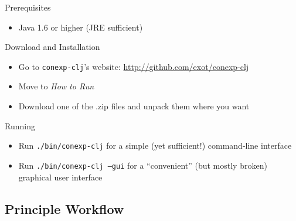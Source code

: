 \documentclass{beamer}
\newcommand{\cclj}{\texttt{conexp-clj}\xspace}
\newenvironment{code}[1]{\begin{block}{Code\ifx#1\empty\else~(#1)\fi}\prompt}{\end{block}}
\newcommand{\prompt}{\texttt{\textcolor{gray}{user=>}}}
\newcommand{\codeinput}[1]{\parbox[t]{0.8\linewidth}{\ifx#1\empty\else\lstinline{#1}\fi}\\}
\newcommand{\codeoutput}[1]{\textit{\texttt{#1}}\\\prompt}
\newcommand{\codeio}[2]{\onslide<+->\codeinput{#1}\onslide<+->\codeoutput{#2}}
\begin{document}
\begin{frame}
  \onslide<+->

  \begin{block}{Prerequisites}
    \begin{itemize}
    \item<+-> Java 1.6 or higher (JRE sufficient)
    \end{itemize}
  \end{block}

  \onslide<+->
  \begin{block}{Download and Installation}
    \begin{itemize}
    \item<+-> Go to \cclj's website: \url{http://github.com/exot/conexp-clj}
    \item<+-> Move to \emph{How to Run}
    \item<+-> Download one of the .zip files and unpack them where you want
    \end{itemize}
  \end{block}

  \onslide<+->
  \begin{block}{Running}
    \begin{itemize}
    \item<+-> Run \texttt{./bin/conexp-clj} for a simple (yet sufficient!) command-line
      interface
    \item<+-> Run \texttt{./bin/conexp-clj ---gui} for a ``convenient'' (but mostly broken)
      graphical user interface %
    \end{itemize}
  \end{block}
\end{frame}

\subsection{Principle Workflow}

\end{document}
